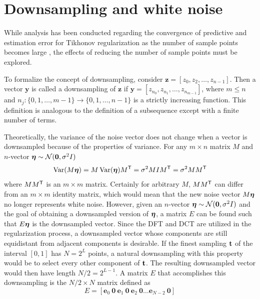 \section{Downsampling and white noise} \label{sec:Downsampling and white noise}
While analysis has been conducted regarding the convergence of predictive and estimation error for Tikhonov regularization as the number of sample points becomes large \cite[p.~109-126]{Vogel:2002}, the effects of reducing the number of sample points must be explored. \par  
To formalize the concept of downsampling, consider $\mathbf{z} = [z_0,z_2,\ldots,z_{n-1}]$. Then a vector $\mathbf{y}$ is called a downsampling of $\mathbf{z}$ if $\mathbf{y} = [z_{n_0},z_{n_1},\ldots,z_{n_{m-1}}]$, where $m \leq n$ and $n_j:\{0,1,\ldots,{m-1}\}\rightarrow\{0,1,\ldots,{n-1}\}$ is a strictly increasing function. This definition is analogous to the definition of a subsequence except with a finite number of terms. \par
Theoretically, the variance of the noise vector does not change when a vector is downsampled because of the properties of variance. For any $m\times n$ matrix $M$ and $n$-vector $\boldsymbol{\eta} \sim \mathcal{N}(\boldsymbol{0},\sigma^2I)$
\begin{equation}
\operatorname{Var}(M\boldsymbol{\eta}) = M\operatorname{Var}(\boldsymbol{\eta}){M}^\mathsf{T} = \sigma^2MI{M}^\mathsf{T} = \sigma^2M{M}^\mathsf{T}
\label{eq:VarProp}
\end{equation}
where $M{M}^\mathsf{T}$ is an $m \times m$ matrix. Certainly for arbitrary $M$, $M{M}^\mathsf{T}$ can differ from an $m \times m$ identity matrix, which would mean that the new noise vector $M\boldsymbol{\eta}$ no longer represents white noise. However, given an $n$-vector $\boldsymbol{\eta} \sim \mathcal{N}(\boldsymbol{0},\sigma^2I)$ and the goal of obtaining a downsampled version of $\boldsymbol{\eta}$, a matrix $E$ can be found such that $E\boldsymbol{\eta}$ is the downsampled vector. Since the DFT and DCT are utilized in the regularization process, a downsampled vector whose components are still equidistant from adjacent components is desirable. If the finest sampling $\mathbf{t}$ of the interval $[0,1]$ has $N = 2^L$ points, a natural downsampling with this property would be to select every other component of $\mathbf{t}$. The resulting downsampled vector would then have length $N/2 = 2^{L-1}$. A matrix $E$ that accomplishes this downsampling is the $N/2 \times N$ matrix defined as
\begin{equation}
E = [\mathbf{e}_0 \: \mathbf{0} \: \mathbf{e}_1 \: \mathbf{0} \: \mathbf{e}_2 \: \mathbf{0} \ldots \mathbf{e}_{N-2} \: \mathbf{0}]
\label{eq:Downsampling matrix}
\end{equation}
